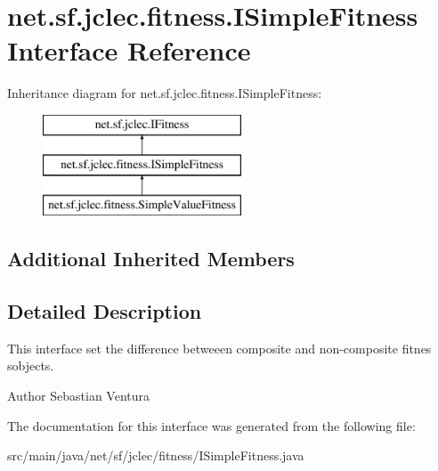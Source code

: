 \hypertarget{interfacenet_1_1sf_1_1jclec_1_1fitness_1_1_i_simple_fitness}{\section{net.\-sf.\-jclec.\-fitness.\-I\-Simple\-Fitness Interface Reference}
\label{interfacenet_1_1sf_1_1jclec_1_1fitness_1_1_i_simple_fitness}
}
Inheritance diagram for net.\-sf.\-jclec.\-fitness.\-I\-Simple\-Fitness\-:\begin{figure}[H]
\begin{center}
\leavevmode
\includegraphics[height=3.000000cm]{interfacenet_1_1sf_1_1jclec_1_1fitness_1_1_i_simple_fitness}
\end{center}
\end{figure}
\subsection*{Additional Inherited Members}


\subsection{Detailed Description}
This interface set the difference betweeen composite and non-\/composite fitnes sobjects.

\begin{DoxyAuthor}{Author}
Sebastian Ventura 
\end{DoxyAuthor}


The documentation for this interface was generated from the following file\-:\begin{DoxyCompactItemize}
\item 
src/main/java/net/sf/jclec/fitness/I\-Simple\-Fitness.\-java\end{DoxyCompactItemize}
